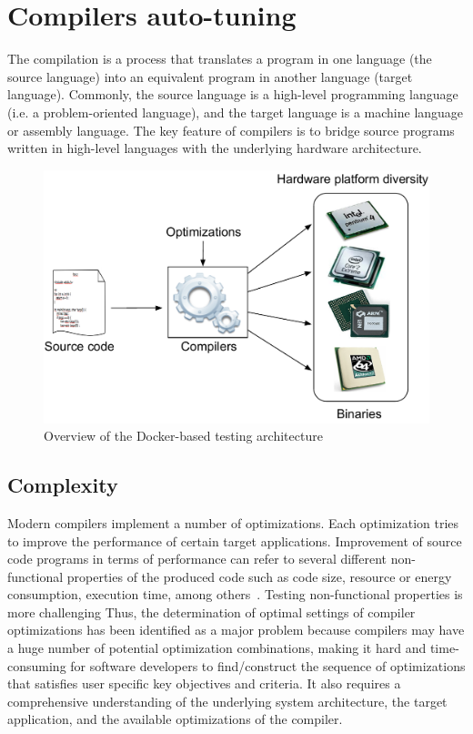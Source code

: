 \section{Compilers auto-tuning}
The compilation is a process that translates a program in one language (the source
language) into an equivalent program in another language (target language). 
Commonly, the source language is a high-level programming language (i.e. a problem-oriented language), and the target language is a machine language or assembly language.
The key feature of compilers is to bridge source programs written in high-level languages with the underlying hardware architecture.
\begin{figure}[h]
	\center
	\includegraphics[scale=0.65]{Background/fig/hardware-diversity.pdf}
	\caption{Overview of the Docker-based testing architecture}
\end{figure}


\subsection{Complexity}
Modern compilers implement a number of optimizations. Each optimization tries to improve the performance of certain target applications. Improvement of source code programs in terms of performance can refer to several different non-functional properties of the produced code such as code size, resource or energy consumption, execution time, among others~\cite{almagor2004finding,pan2006fast}.
Testing non-functional properties is more challenging 
Thus, the determination of optimal settings of compiler optimizations has been identified as a major problem because compilers may have a huge number of potential optimization combinations, making it hard and time-consuming for software developers to find/construct the sequence of optimizations that satisfies user specific key objectives and criteria. It also requires a comprehensive understanding of the underlying system architecture, the target application, and the available optimizations of the compiler.




